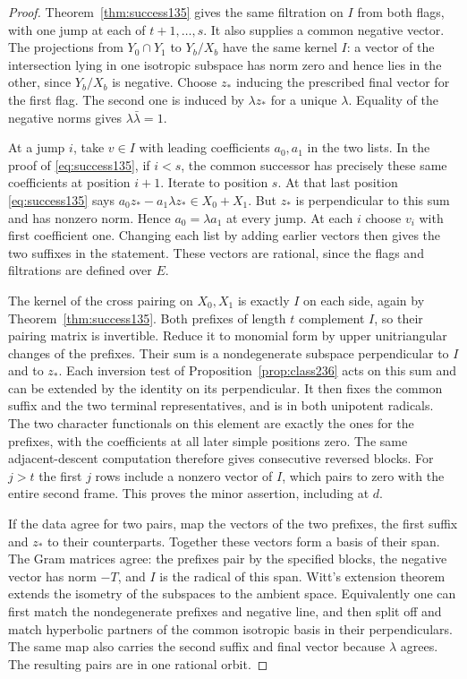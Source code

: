 \documentclass[a4paper,11pt]{article}
\theoremstyle{definition}
\theoremstyle{remark}
\numberwithin{equation}{section}
\begin{document}
\begin{proof}
Theorem~\ref{thm:success135} gives the same filtration on
\(I\) from both flags, with one jump at each of
\(t+1,\ldots,s\). It also supplies a common negative vector.
The projections from \(Y_0\cap Y_1\) to \(Y_b/X_b\) have
the same kernel \(I\): a vector of the intersection lying in
one isotropic subspace has norm zero and hence lies in the
other, since \(Y_b/X_b\) is negative. Choose \(z_*\) inducing
the prescribed final vector for the first flag. The second
one is induced by \(\lambda z_*\) for a unique \(\lambda\).
Equality of the negative norms gives \(\lambda\bar\lambda=1\).

At a jump \(i\), take \(v\in I\) with leading coefficients
\(a_0,a_1\) in the two lists. In the proof of
\eqref{eq:success135}, if \(i<s\), the common successor
has precisely these same coefficients at position \(i+1\).
Iterate to position \(s\). At that last position
\eqref{eq:success135} says \(a_0 z_*-a_1\lambda z_*\in X_0+X_1\).
But \(z_*\) is perpendicular to this sum and has nonzero
norm. Hence \(a_0=\lambda a_1\) at every jump. At each \(i\)
choose \(v_i\) with first coefficient one. Changing each list
by adding earlier vectors then gives the two suffixes in the
statement. These vectors are rational, since the flags and
filtrations are defined over \(E\).

The kernel of the cross pairing on \(X_0,X_1\) is exactly \(I\)
on each side, again by Theorem~\ref{thm:success135}. Both
prefixes of length \(t\) complement \(I\), so their pairing
matrix is invertible. Reduce it to monomial form by upper
unitriangular changes of the prefixes. Their sum is a
nondegenerate subspace perpendicular to \(I\) and to \(z_*\).
Each inversion test of Proposition~\ref{prop:class236}
acts on this sum and can be extended by the identity on its
perpendicular. It then fixes the common suffix and the two
terminal representatives, and is in both unipotent radicals.
The two character functionals on this element are exactly the
ones for the prefixes, with the coefficients at all later
simple positions zero. The same adjacent-descent computation
therefore gives consecutive reversed blocks. For \(j>t\) the
first \(j\) rows include a nonzero vector of \(I\), which pairs
to zero with the entire second frame. This proves the minor
assertion, including at \(d\).

If the data agree for two pairs, map the vectors of the two
prefixes, the first suffix and \(z_*\) to their counterparts.
Together these vectors form a basis of their span. The Gram
matrices agree: the prefixes pair by the specified blocks,
the negative vector has norm \(-T\), and \(I\) is the radical
of this span. Witt's extension theorem extends the isometry of
the subspaces to the ambient space. Equivalently one can first
match the nondegenerate prefixes and negative line, and then
split off and match hyperbolic partners of the common isotropic
basis in their perpendiculars. The same map also carries the
second suffix and final vector because \(\lambda\) agrees.
The resulting pairs are in one rational orbit.
\end{proof}
\end{document}
